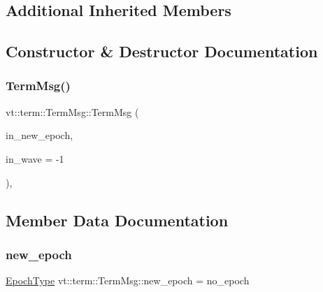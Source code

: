\subsection*{Additional Inherited Members}


\subsection{Constructor \& Destructor Documentation}
\mbox{\label{structvt_1_1term_1_1_term_msg_a099cbed49c4d73d9627c20463334db39}} 
\subsubsection{\texorpdfstring{Term\+Msg()}{TermMsg()}}
{\footnotesize\ttfamily vt\+::term\+::\+Term\+Msg\+::\+Term\+Msg (\begin{DoxyParamCaption}\item[{\hyperlink{namespacevt_a985a5adf291c34a3ca263b3378388236}{Epoch\+Type} const \&}]{in\+\_\+new\+\_\+epoch,  }\item[{\hyperlink{namespacevt_1_1term_a4fd378cdb0c36683afc1b3399d685f7f}{Term\+Counter\+Type}}]{in\+\_\+wave = {\ttfamily -\/1} }\end{DoxyParamCaption})\hspace{0.3cm}{\ttfamily [inline]}, {\ttfamily [explicit]}}



\subsection{Member Data Documentation}
\mbox{\label{structvt_1_1term_1_1_term_msg_a1890be8aa1a0d1a148331d3c0ea229e3}} 
\subsubsection{\texorpdfstring{new\+\_\+epoch}{new\_epoch}}
{\footnotesize\ttfamily \hyperlink{namespacevt_a985a5adf291c34a3ca263b3378388236}{Epoch\+Type} vt\+::term\+::\+Term\+Msg\+::new\+\_\+epoch = no\+\_\+epoch}

